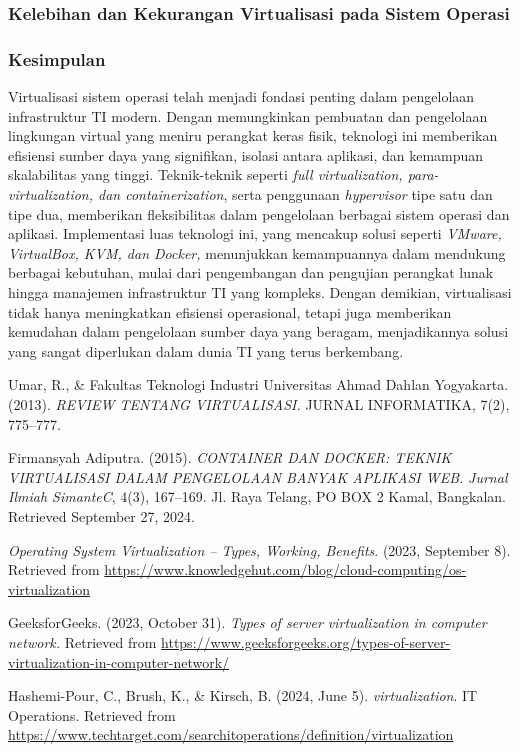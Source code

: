 \documentclass[12pt]{article}
\begin{document}
\subsubsection{Kelebihan dan Kekurangan Virtualisasi pada Sistem Operasi}
\subsubsection{Kesimpulan}
    \par Virtualisasi sistem operasi telah menjadi fondasi penting dalam pengelolaan infrastruktur TI modern. Dengan memungkinkan pembuatan dan pengelolaan lingkungan virtual yang meniru perangkat keras fisik, teknologi ini memberikan efisiensi sumber daya yang signifikan, isolasi antara aplikasi, dan kemampuan skalabilitas yang tinggi. Teknik-teknik seperti\textit{ full virtualization, para-virtualization, dan containerization}, serta penggunaan \textit{hypervisor} tipe satu dan tipe dua, memberikan fleksibilitas dalam pengelolaan berbagai sistem operasi dan aplikasi. Implementasi luas teknologi ini, yang mencakup solusi seperti \textit{VMware, VirtualBox, KVM, dan Docker,} menunjukkan kemampuannya dalam mendukung berbagai kebutuhan, mulai dari pengembangan dan pengujian perangkat lunak hingga manajemen infrastruktur TI yang kompleks. Dengan demikian, virtualisasi tidak hanya meningkatkan efisiensi operasional, tetapi juga memberikan kemudahan dalam pengelolaan sumber daya yang beragam, menjadikannya solusi yang sangat diperlukan dalam dunia TI yang terus berkembang.

    \begin{thebibliography}{9}
        Umar, R., \& Fakultas Teknologi Industri Universitas Ahmad Dahlan Yogyakarta. (2013).\textit{ REVIEW TENTANG VIRTUALISASI.} JURNAL INFORMATIKA, 7(2), 775–777. 
        
        Firmansyah Adiputra. (2015). \textit{CONTAINER DAN DOCKER: TEKNIK VIRTUALISASI DALAM PENGELOLAAN BANYAK APLIKASI WEB.} \textit{Jurnal Ilmiah SimanteC}, 4(3), 167–169. Jl. Raya Telang, PO BOX 2 Kamal, Bangkalan. Retrieved September 27, 2024.
        
        \textit{Operating System Virtualization – Types, Working, Benefits}. (2023, September 8). Retrieved from \url{https://www.knowledgehut.com/blog/cloud-computing/os-virtualization}
        
        GeeksforGeeks. (2023, October 31). \textit{Types of server virtualization in computer network.} Retrieved from \url{https://www.geeksforgeeks.org/types-of-server-virtualization-in-computer-network/}
        
        Hashemi-Pour, C., Brush, K., \& Kirsch, B. (2024, June 5). \textit{virtualization}. IT Operations. Retrieved from \url{https://www.techtarget.com/searchitoperations/definition/virtualization}
    \end{thebibliography}
\end{document}
